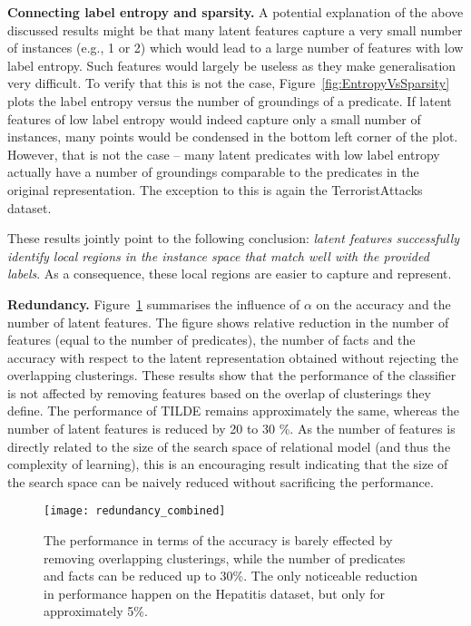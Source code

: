 \textbf{Connecting label entropy and sparsity.}
A potential explanation of the above discussed results might be that many latent features capture a very small number of instances (e.g., 1 or 2) which would lead to a large number of features with low label entropy.
Such features would largely be useless as they make generalisation very difficult.
To verify that this is not the case, Figure~\ref{fig:EntropyVsSparsity} plots the label entropy versus the number of groundings of a predicate.
If latent features of low label entropy would indeed capture only a small number of instances, many points would be condensed in the bottom left corner of the plot.
However, that is not the case -- many latent predicates with low label entropy actually have a number of groundings comparable to the predicates in the original representation.
The exception to this is again the TerroristAttacks dataset.

These results jointly point to the following conclusion: \textit{latent features successfully identify local regions in the instance space that match well with the provided labels}.
As a consequence, these local regions are easier to capture and represent.









\textbf{Redundancy.}
Figure~\ref{fig:Redundancy} summarises the influence of $\alpha$ on the accuracy and the number of latent features.
The figure shows relative reduction in the number of features (equal to the number of predicates), the number of facts and the accuracy with  respect to the latent representation obtained without rejecting the overlapping clusterings.
These results show that the performance of the classifier is not affected by removing features based on the overlap of clusterings they define.
The performance of TILDE remains approximately the same, whereas the number of latent features is reduced by 20 to 30 \%.
As the number of features is directly related to the size of the search space of relational model (and thus the complexity of learning), this is an encouraging result indicating that the size of the search space can be naively reduced without sacrificing the performance.








\begin{figure}[t]
	\centering
	\medskip
    \texttt{[image: redundancy\_combined]}
    \caption[Redundancy in latent representations created by \gls{curled}]{The performance in terms of the accuracy is barely effected by removing overlapping clusterings, while the number of predicates and facts can be reduced up to 30\%. The only noticeable reduction in performance happen on the Hepatitis dataset, but only for approximately 5\%.   }
    \label{fig:Redundancy}
\end{figure}







